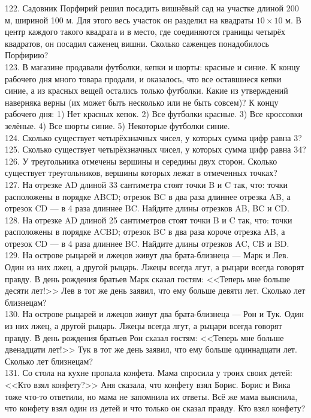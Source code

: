 \documentclass[12pt]{article}
\begin{document}
122. Садовник Порфирий решил посадить вишнёвый сад на участке длиной 200 м, шириной 100 м. Для этого весь участок он разделил на квадраты $10\times10$ м. В центр каждого такого квадрата и в место, где соединяются границы четырёх квадратов, он посадил саженец вишни. Сколько саженцев понадобилось Порфирию?\\
123. В магазине продавали футболки, кепки и шорты: красные и синие. К концу рабочего дня много товара продали, и оказалось, что все оставшиеся кепки синие, а из красных вещей остались только футболки. Какие из утверждений наверняка верны (их может быть несколько или не быть совсем)? К концу рабочего дня: 1) Нет красных кепок. 2) Все футболки красные. 3) Все кроссовки зелёные. 4) Все шорты синие. 5) Некоторые футболки синие.\\
124. Сколько существует четырёхзначных чисел, у которых сумма цифр равна 3?\\
125. Сколько существует четырёхзначных чисел, у которых сумма цифр равна 34?\\
126. У треугольника отмечены вершины и середины двух сторон. Сколько существует треугольников, вершины которых лежат в отмеченных точках?\\
127. На отрезке AD длиной 33 сантиметра стоят точки B и C так, что: точки расположены в порядке ABCD; отрезок BC в два раза длиннее отрезка AB, а отрезок CD --- в 4 раза длиннее BC. Найдите длины отрезков AB, BC и CD.\\
128. На отрезке AD длиной 25 сантиметров стоят точки B и C так, что: точки расположены в порядке ACBD; отрезок BC в два раза короче отрезка AB, а отрезок CD --- в 4 раза длиннее BC. Найдите длины отрезков AC, CB и BD.\\
129. На острове рыцарей и лжецов живут два брата-близнеца --- Марк и Лев. Один из них лжец, а другой рыцарь. Лжецы всегда лгут, а рыцари всегда говорят правду. В день рождения братьев Марк сказал гостям: <<Теперь мне больше десяти лет!>> Лев в тот же день заявил, что ему больше девяти лет. Сколько лет близнецам?\\
130. На острове рыцарей и лжецов живут два брата-близнеца --- Рон и Тук. Один из них лжец, а другой рыцарь. Лжецы всегда лгут, а рыцари всегда говорят правду. В день рождения братьев Рон сказал гостям: <<Теперь мне больше двенадцати лет!>> Тук в тот же день заявил, что ему больше одиннадцати лет. Сколько лет близнецам?\\
131. Со стола на кухне пропала конфета. Мама спросила у троих своих детей: <<Кто взял конфету?>> Аня сказала, что конфету взял Борис. Борис и Вика тоже что-то ответили, но мама не запомнила их ответы. Всё же мама выяснила, что конфету взял один из детей и что только он сказал правду. Кто взял конфету?\\
\end{document}
